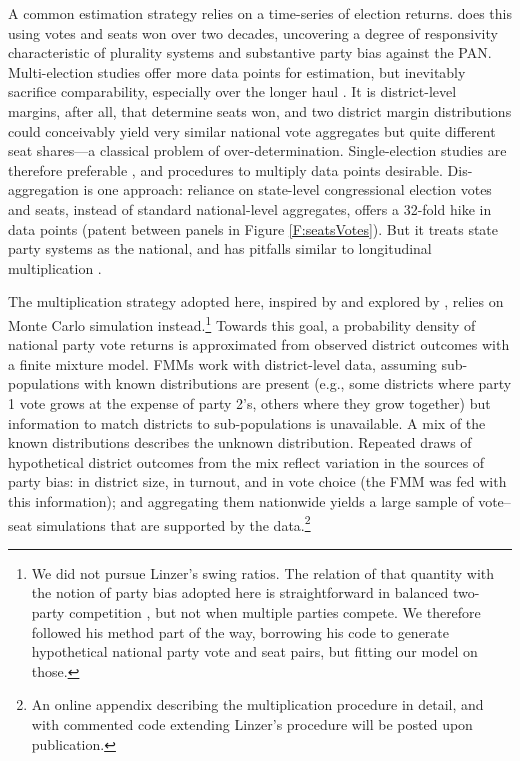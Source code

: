 \documentclass[letter,12pt]{article}
\begin{document}
A common estimation strategy relies on a time-series of election returns. \citet{marquez2014biasBlog} does this using votes and seats won over two decades, uncovering a degree of responsivity characteristic of plurality systems and substantive party bias against the PAN. Multi-election studies offer more data points for estimation, but inevitably sacrifice comparability, especially over the longer haul \citep{jackmanMeasuringBias1994}. It is district-level margins, after all, that determine seats won, and two district margin distributions could conceivably yield very similar national vote aggregates but quite different seat shares---a classical problem of over-determination. Single-election studies are therefore preferable \citep{niemi.fett1986swing}, and procedures to multiply data points desirable. Dis-aggregation is one approach: reliance on state-level congressional election votes and seats, instead of standard national-level aggregates, offers a 32-fold hike in data points (patent between panels in Figure \ref{F:seatsVotes}). But it treats state party systems as the national, and has pitfalls similar to longitudinal multiplication \citep[][ attempt this approach]{magar.altman.mcd.trelles2014uh}. %

The multiplication strategy adopted here, inspired by \citet{linzerSeatVoteElasticity2012} and explored by \citet{marquez2014mixSwingBlog}, relies on Monte Carlo simulation instead.\footnote{We did not pursue Linzer's swing ratios. The relation of that quantity with the notion of party bias adopted here is straightforward in balanced two-party competition \citep[see][:410]{linzerSeatVoteElasticity2012}, but not when multiple parties compete. We therefore followed his method part of the way, borrowing his code to generate hypothetical national party vote and seat pairs, but fitting our model on those.} Towards this goal, a probability density of national party vote returns is approximated from observed district outcomes with a finite mixture model. FMMs work with district-level data, assuming sub-populations with known distributions are present (e.g., some districts where party 1 vote grows at the expense of party 2's, others where they grow together) but information to match districts to sub-populations is unavailable. A mix of the known distributions describes the unknown distribution. Repeated draws of hypothetical district outcomes from the mix reflect variation in the sources of party bias: in district size, in turnout, and in vote choice (the FMM was fed with this information); and aggregating them nationwide yields a large sample of vote--seat simulations that are supported by the data.\footnote{An online appendix describing the multiplication procedure in detail, and with commented code extending Linzer's procedure will be posted upon publication.} 
\end{document}
